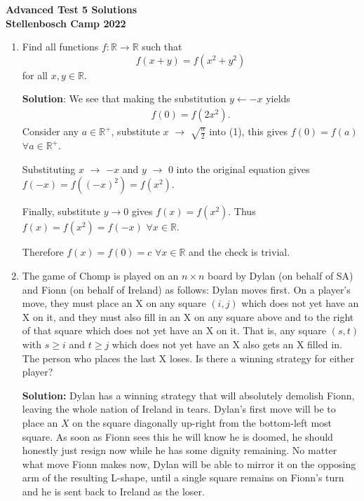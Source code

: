 \documentclass{article}
\begin{document}
\thispagestyle{empty}

\begin{center}
  \textbf{\Large Advanced Test 5 Solutions}
  \\ \vspace{1em}
  \textbf{\large Stellenbosch Camp 2022}
\end{center}

\bigskip

\begin{enumerate}[itemsep=24pt plus 12pt minus 9pt]

\item %
Find all functions $f : \mathbb{R} \to \mathbb{R}$ such that \[ f(x+y) = f(x^2+y^2) \] for all $x,y \in \mathbb{R}$.

\textbf{Solution}:
We see that making the substitution $y \leftarrow -x$ yields 
\begin{align}
  f(0) = f(2x^{2}).
\end{align}
Consider any $a \in \mathbb{R}^+$, substitute $x$ $\rightarrow$ $\sqrt{\frac{a}{2}}$ into (1), this gives $f(0) = f(a)$ $\forall a \in \mathbb{R^{+}}$.

Substituting $x$ $\rightarrow$ $-x$ and $y$ $\rightarrow$ $0$ into the original equation gives $f(-x) = f((-x)^{2}) = f(x^{2})$.

Finally, substitute $y \rightarrow 0$ gives $f(x) = f(x^{2})$. Thus $f(x)= f(x^{2}) = f(-x)$ $\forall x \in \mathbb{R}$.

Therefore $f(x) = f(0) = c$ $\forall x \in \mathbb{R}$ and the check is trivial.


\item %
The game of Chomp is played on an $n \times n$ board by Dylan (on behalf of SA) and Fionn (on behalf of Ireland) as follows: Dylan moves first.
On a player's move, they must place an X on any square $(i, j)$ which does not yet have an X on it, and they must also fill in an X on any square above and to the right of that square which does not yet have an X on it.
That is, any square $(s, t)$ with $s \geq i$ and $t \geq j$ which does not yet have an X also gets an X filled in.
The person who places the last X loses.
Is there a winning strategy for either player?

\textbf{Solution:}
Dylan has a winning strategy that will absolutely demolish Fionn, leaving the whole nation of Ireland in tears.
Dylan's first move will be to place an $X$ on the square diagonally up-right from the bottom-left most square. As soon as Fionn sees this he will know he is doomed, he should honestly just resign now while he has some dignity remaining.
No matter what move Fionn makes now, Dylan will be able to mirror it on the opposing arm of the resulting L-shape, until a single square remains on Fionn's turn and he is sent back to Ireland as the loser.


\end{enumerate}
\end{document}
